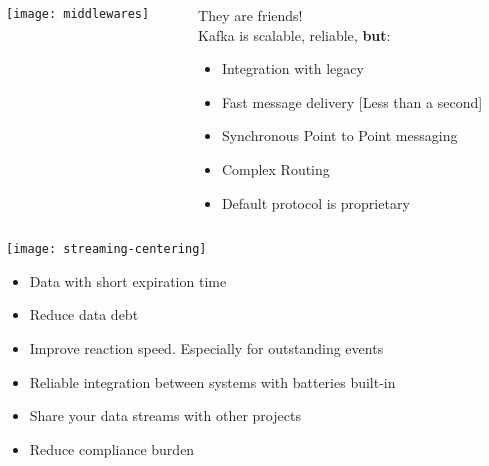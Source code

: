\documentclass[aspectratio=169, 15pt,usenames,dvipsnames]{beamer}
\begin{document}
\begin{gdsw}
	\begin{columns}
		\begin{column}{0.4\textwidth}
			\texttt{[image: middlewares]} 
		\end{column}
		\begin{column}{0.6\textwidth}
			\large
			They are friends!\\
			Kafka is scalable, reliable, {\bf but}:
			\begin{itemize}
				\item Integration with legacy
				\pause
				\item Fast message delivery [Less than a second]
				\pause
				\item Synchronous Point to Point messaging
				\item Complex Routing
				\item Default protocol is proprietary
			\end{itemize}	
		\end{column}
	\end{columns}	
\end{gdsw}
\begin{gdsw}
	\centering\texttt{[image: streaming-centering]}         
	\begin{center}
		\begin{itemize}
			\item Data with short expiration time
			\item Reduce data debt
			\item Improve reaction speed. Especially for outstanding events
			\item Reliable integration between systems with batteries built-in
			\item Share your data streams with other projects
			\item Reduce compliance burden
		\end{itemize}
	\end{center}
\end{gdsw}
\end{document}
